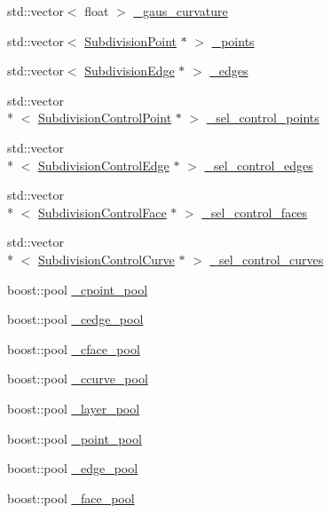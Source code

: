 \begin{DoxyCompactItemize}
\item 
std\-::vector$<$ float $>$ \hyperlink{classShipCAD_1_1SubdivisionSurface_a20cbcc689f7b2f8af21f502748521185}{\-\_\-gaus\-\_\-curvature}
\item 
std\-::vector$<$ \hyperlink{classShipCAD_1_1SubdivisionPoint}{Subdivision\-Point} $\ast$ $>$ \hyperlink{classShipCAD_1_1SubdivisionSurface_ab03b7f4694a63eeb3ebb831484cb1bff}{\-\_\-points}
\item 
std\-::vector$<$ \hyperlink{classShipCAD_1_1SubdivisionEdge}{Subdivision\-Edge} $\ast$ $>$ \hyperlink{classShipCAD_1_1SubdivisionSurface_a709c44779394f03c06c16adba6187ecd}{\-\_\-edges}
\item 
std\-::vector\\*
$<$ \hyperlink{classShipCAD_1_1SubdivisionControlPoint}{Subdivision\-Control\-Point} $\ast$ $>$ \hyperlink{classShipCAD_1_1SubdivisionSurface_aefa02ffcdf17a06acd80f4274e509981}{\-\_\-sel\-\_\-control\-\_\-points}
\item 
std\-::vector\\*
$<$ \hyperlink{classShipCAD_1_1SubdivisionControlEdge}{Subdivision\-Control\-Edge} $\ast$ $>$ \hyperlink{classShipCAD_1_1SubdivisionSurface_a27011a827021fda5a4f2bb8828e157ca}{\-\_\-sel\-\_\-control\-\_\-edges}
\item 
std\-::vector\\*
$<$ \hyperlink{classShipCAD_1_1SubdivisionControlFace}{Subdivision\-Control\-Face} $\ast$ $>$ \hyperlink{classShipCAD_1_1SubdivisionSurface_a612889fd7e746cca042c63b2ab2cd110}{\-\_\-sel\-\_\-control\-\_\-faces}
\item 
std\-::vector\\*
$<$ \hyperlink{classShipCAD_1_1SubdivisionControlCurve}{Subdivision\-Control\-Curve} $\ast$ $>$ \hyperlink{classShipCAD_1_1SubdivisionSurface_aeac6a33f098ee8dadfc9482edc1a60a5}{\-\_\-sel\-\_\-control\-\_\-curves}
\item 
boost\-::pool \hyperlink{classShipCAD_1_1SubdivisionSurface_abd895a11906e0d5b5f8f4a5fc090b428}{\-\_\-cpoint\-\_\-pool}
\item 
boost\-::pool \hyperlink{classShipCAD_1_1SubdivisionSurface_a413da68890d958a7994d09e0906be102}{\-\_\-cedge\-\_\-pool}
\item 
boost\-::pool \hyperlink{classShipCAD_1_1SubdivisionSurface_a6bb58101a0ee9c4f06e1fdf86f0cded1}{\-\_\-cface\-\_\-pool}
\item 
boost\-::pool \hyperlink{classShipCAD_1_1SubdivisionSurface_ae20f94c83bac02bae90a905379765b0a}{\-\_\-ccurve\-\_\-pool}
\item 
boost\-::pool \hyperlink{classShipCAD_1_1SubdivisionSurface_a953485df23e6f7393868b436384debef}{\-\_\-layer\-\_\-pool}
\item 
boost\-::pool \hyperlink{classShipCAD_1_1SubdivisionSurface_a98af3f1b9fa4412756cadf4fe561f062}{\-\_\-point\-\_\-pool}
\item 
boost\-::pool \hyperlink{classShipCAD_1_1SubdivisionSurface_a7a7e25c91a06ca2b3f3d27a5ca310f08}{\-\_\-edge\-\_\-pool}
\item 
boost\-::pool \hyperlink{classShipCAD_1_1SubdivisionSurface_a2f746c1c19594b1baa03e9c49c9ffd0a}{\-\_\-face\-\_\-pool}
\end{DoxyCompactItemize}



